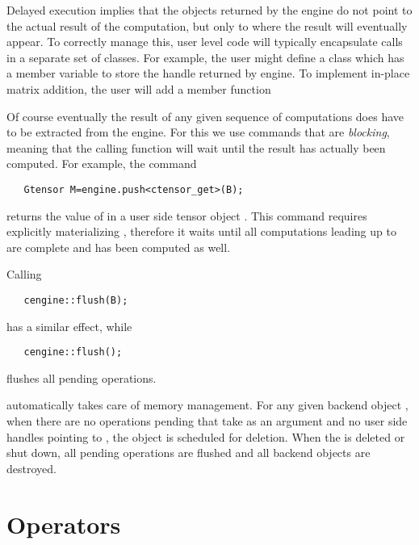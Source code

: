 Delayed execution implies that the  objects returned by the engine do not 
point to the actual result of the computation, but only to where the result will eventually appear. 
To correctly manage this, user level code will typically encapsulate  calls in 
a separate set of classes. For example, the user might define a  class which has 
a member variable  to store the handle returned by engine. 
To implement in-place matrix addition, the user will add a member function 


Of course eventually the result of any given sequence of computations 
does have to be extracted from the engine. %
For this we use commands that are \emph{blocking}, meaning that the calling function will  
wait until the result has actually been computed. For example, the command 

\texttt{~~~Gtensor M=engine.push<ctensor\_get>(B);}

returns the value of  in a user side tensor object . This command requires 
explicitly materializing , therefore it waits until all computations leading up to  
are complete and  has been computed as well. 

Calling 

\texttt{~~~cengine::flush(B);}

has a similar effect, while 

\texttt{~~~cengine::flush();}

flushes all pending operations.  

\Cengine{} automatically takes care of memory management. 
For any given backend object , when there are no operations pending that take  
as an argument and no user side handles pointing to , 
the object is scheduled for deletion. 
When the  is deleted or shut down, all pending 
operations are flushed and all backend objects are destroyed. 

\section*{Operators}

